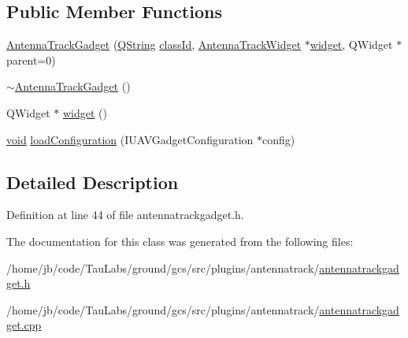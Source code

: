 \subsection*{\-Public \-Member \-Functions}
\begin{DoxyCompactItemize}
\item 
\hyperlink{group___antenna_track_gadget_plugin_gafa295298db3662b9107fa1506ab434f7}{\-Antenna\-Track\-Gadget} (\hyperlink{group___u_a_v_objects_plugin_gab9d252f49c333c94a72f97ce3105a32d}{\-Q\-String} \hyperlink{group___core_plugin_ga3878fde66a57220608960bcc3fbeef2c}{class\-Id}, \hyperlink{class_antenna_track_widget}{\-Antenna\-Track\-Widget} $\ast$\hyperlink{group___antenna_track_gadget_plugin_ga890a1b4ef09527df4e205d76d2378da1}{widget}, \-Q\-Widget $\ast$parent=0)
\item 
\hyperlink{group___antenna_track_gadget_plugin_ga90012834df22b16c7824162b33eae46d}{$\sim$\-Antenna\-Track\-Gadget} ()
\item 
\-Q\-Widget $\ast$ \hyperlink{group___antenna_track_gadget_plugin_ga890a1b4ef09527df4e205d76d2378da1}{widget} ()
\item 
\hyperlink{group___u_a_v_objects_plugin_ga444cf2ff3f0ecbe028adce838d373f5c}{void} \hyperlink{group___antenna_track_gadget_plugin_ga05e5ae93f50d470a38cd699e5662fcbf}{load\-Configuration} (\-I\-U\-A\-V\-Gadget\-Configuration $\ast$config)
\end{DoxyCompactItemize}


\subsection{\-Detailed \-Description}


\-Definition at line 44 of file antennatrackgadget.\-h.



\-The documentation for this class was generated from the following files\-:\begin{DoxyCompactItemize}
\item 
/home/jb/code/\-Tau\-Labs/ground/gcs/src/plugins/antennatrack/\hyperlink{antennatrackgadget_8h}{antennatrackgadget.\-h}\item 
/home/jb/code/\-Tau\-Labs/ground/gcs/src/plugins/antennatrack/\hyperlink{antennatrackgadget_8cpp}{antennatrackgadget.\-cpp}\end{DoxyCompactItemize}
